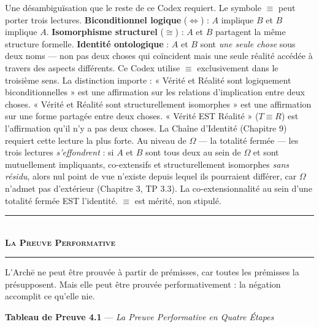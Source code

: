\documentclass[10pt, openany, oneside]{book}
\renewcommand{\normalsize}{\fontsize{10}{13}\selectfont}
\begin{document}
Une désambiguïsation que le reste de ce Codex requiert. Le symbole $\equiv$ peut porter trois lectures. \textbf{Biconditionnel logique} ($\iff$) : $A$ implique $B$ et $B$ implique $A$. \textbf{Isomorphisme structurel} ($\cong$) : $A$ et $B$ partagent la même structure formelle. \textbf{Identité ontologique} : $A$ et $B$ sont \textit{une seule chose} sous deux noms --- non pas deux choses qui coïncident mais une seule réalité accédée à travers des aspects différents. Ce Codex utilise $\equiv$ exclusivement dans le troisième sens. La distinction importe : « Vérité et Réalité sont logiquement biconditionnelles » est une affirmation sur les relations d'implication entre deux choses. « Vérité et Réalité sont structurellement isomorphes » est une affirmation sur une forme partagée entre deux choses. « Vérité EST Réalité » ($T \equiv R$) est l'affirmation qu'il n'y a pas deux choses. La Chaîne d'Identité (Chapitre 9) requiert cette lecture la plus forte. Au niveau de $\Omega$ --- la totalité fermée --- les trois lectures \textit{s'effondrent} : si $A$ et $B$ sont tous deux au sein de $\Omega$ et sont mutuellement impliquants, co-extensifs et structurellement isomorphes \textit{sans résidu}, alors nul point de vue n'existe depuis lequel ils pourraient différer, car $\Omega$ n'admet pas d'extérieur (Chapitre 3, TP 3.3). La co-extensionnalité au sein d'une totalité fermée EST l'identité. $\equiv$ est mérité, non stipulé.

\vspace{1.5em}


\begin{center}
    \rule{0.3\textwidth}{0.4pt}\\[0.5em]
    {\normalsize\bfseries\scshape La Preuve Performative}\\[0.3em]
    \rule{0.3\textwidth}{0.4pt}
\end{center}

\vspace{1em}

\noindent L'Arch\={e} ne peut être prouvée à partir de prémisses, car toutes les prémisses la présupposent. Mais elle peut être prouvée performativement : la négation accomplit ce qu'elle nie.

\vspace{0.5em}

\textbf{Tableau de Preuve 4.1} --- \textit{La Preuve Performative en Quatre Étapes}
\end{document}

